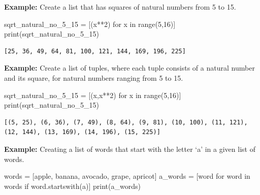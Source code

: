 \documentclass[
  letterpaper,
  DIV=11,
  numbers=noendperiod]{scrreprt}
\newenvironment{Shaded}{\begin{snugshade}}{\end{snugshade}}
\newcommand{\BuiltInTok}[1]{\textcolor[rgb]{0.00,0.23,0.31}{#1}}
\newcommand{\ControlFlowTok}[1]{\textcolor[rgb]{0.00,0.23,0.31}{#1}}
\newcommand{\DecValTok}[1]{\textcolor[rgb]{0.68,0.00,0.00}{#1}}
\newcommand{\KeywordTok}[1]{\textcolor[rgb]{0.00,0.23,0.31}{#1}}
\newcommand{\NormalTok}[1]{\textcolor[rgb]{0.00,0.23,0.31}{#1}}
\newcommand{\OperatorTok}[1]{\textcolor[rgb]{0.37,0.37,0.37}{#1}}
\newcommand{\StringTok}[1]{\textcolor[rgb]{0.13,0.47,0.30}{#1}}
\begin{document}
\textbf{Example:} Create a list that has squares of natural numbers from
5 to 15.

\begin{Shaded}
\begin{Highlighting}[]
\NormalTok{sqrt\_natural\_no\_5\_15 }\OperatorTok{=}\NormalTok{ [(x}\OperatorTok{**}\DecValTok{2}\NormalTok{) }\ControlFlowTok{for}\NormalTok{ x }\KeywordTok{in} \BuiltInTok{range}\NormalTok{(}\DecValTok{5}\NormalTok{,}\DecValTok{16}\NormalTok{)]}
\BuiltInTok{print}\NormalTok{(sqrt\_natural\_no\_5\_15)}
\end{Highlighting}
\end{Shaded}

\begin{verbatim}
[25, 36, 49, 64, 81, 100, 121, 144, 169, 196, 225]
\end{verbatim}

\textbf{Example:} Create a list of tuples, where each tuple consists of
a natural number and its square, for natural numbers ranging from 5 to
15.

\begin{Shaded}
\begin{Highlighting}[]
\NormalTok{sqrt\_natural\_no\_5\_15 }\OperatorTok{=}\NormalTok{ [(x,x}\OperatorTok{**}\DecValTok{2}\NormalTok{) }\ControlFlowTok{for}\NormalTok{ x }\KeywordTok{in} \BuiltInTok{range}\NormalTok{(}\DecValTok{5}\NormalTok{,}\DecValTok{16}\NormalTok{)]}
\BuiltInTok{print}\NormalTok{(sqrt\_natural\_no\_5\_15)}
\end{Highlighting}
\end{Shaded}

\begin{verbatim}
[(5, 25), (6, 36), (7, 49), (8, 64), (9, 81), (10, 100), (11, 121), (12, 144), (13, 169), (14, 196), (15, 225)]
\end{verbatim}

\textbf{Example:} Creating a list of words that start with the letter
`a' in a given list of words.

\begin{Shaded}
\begin{Highlighting}[]
\NormalTok{words }\OperatorTok{=}\NormalTok{ [}\StringTok{\textquotesingle{}apple\textquotesingle{}}\NormalTok{, }\StringTok{\textquotesingle{}banana\textquotesingle{}}\NormalTok{, }\StringTok{\textquotesingle{}avocado\textquotesingle{}}\NormalTok{, }\StringTok{\textquotesingle{}grape\textquotesingle{}}\NormalTok{, }\StringTok{\textquotesingle{}apricot\textquotesingle{}}\NormalTok{]}
\NormalTok{a\_words }\OperatorTok{=}\NormalTok{ [word }\ControlFlowTok{for}\NormalTok{ word }\KeywordTok{in}\NormalTok{ words }\ControlFlowTok{if}\NormalTok{ word.startswith(}\StringTok{\textquotesingle{}a\textquotesingle{}}\NormalTok{)]}
\BuiltInTok{print}\NormalTok{(a\_words)}
\end{Highlighting}
\end{Shaded}
\end{document}
